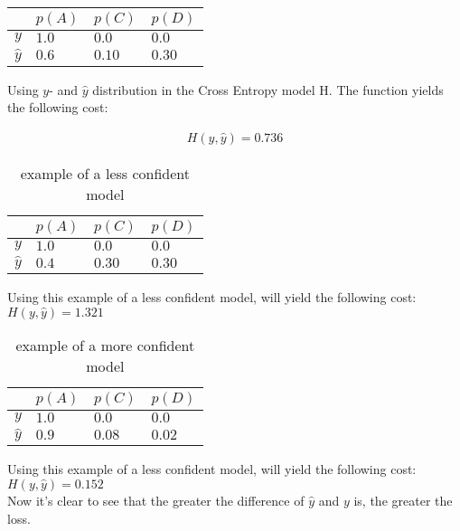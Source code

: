 \begin{table}[h]
\centering
\begin{tabular}{|l|l|l|l|}
\hline
           & $p(A)$ & $p(C)$ & $p(D)$ \\ \hline
$y$       & $1.0$  & $0.0$  & $0.0 $ \\ \hline
$\hat{y}$ & $0.6$  & $0.10$ & $0.30$ \\ \hline
\end{tabular}
\end{table}

Using $y$- and $\hat{y}$ distribution in the Cross Entropy model H. The function yields the following cost:

\begin{align}
    H(y,\hat{y}) = 0.736
\end{align}

\begin{table}[h]
\centering
\begin{tabular}{|l|l|l|l|}
\hline
           & $p(A)$ & $p(C)$ & $p(D)$ \\ \hline
$y$       & $1.0$  & $0.0$  & $0.0 $ \\ \hline
$\hat{y}$ & $0.4$  & $0.30$ & $0.30$ \\ \hline
\end{tabular}
\caption{example of a less confident model}\label{Baseline:before}
\end{table}

\noindent
Using this example of a less confident model, will yield the following cost: $H(y,\hat{y}) = 1.321$\\

\begin{table}[h]
\centering
\begin{tabular}{|l|l|l|l|}
\hline
           & $p(A)$ & $p(C)$ & $p(D)$ \\ \hline
$y$       & $1.0$  & $0.0$  & $0.0 $ \\ \hline
$\hat{y}$ & $0.9$  & $0.08$ & $0.02$ \\ \hline
\end{tabular}
\caption{example of a more confident model}\label{Baseline:before}
\end{table}

\noindent
Using this example of a less confident model, will yield the following cost: $H(y,\hat{y}) = 0.152$\\

\noindent
Now it's clear to see that the greater the difference of $\hat{y}$ and $y$ is, the greater the loss.